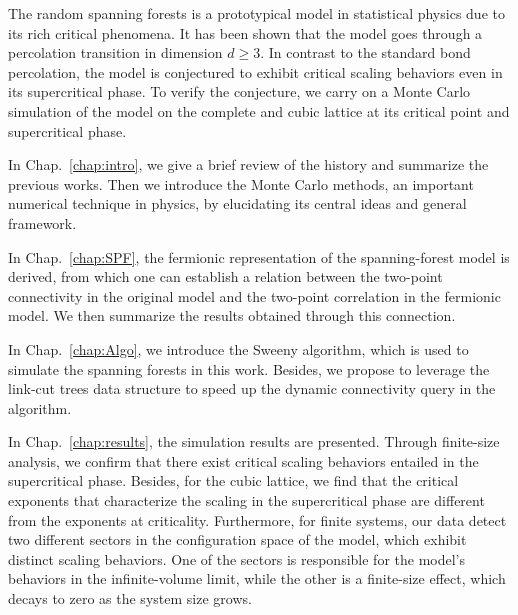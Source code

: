 \begin{abstract*}
The random spanning forests is a prototypical model in statistical physics due to its rich critical phenomena.
It has been shown that the model goes through a percolation transition in dimension $d\geq 3$. In contrast to the standard bond percolation, the model
is conjectured to exhibit critical scaling behaviors even in its supercritical phase. To verify the conjecture, we carry on a Monte
Carlo simulation of the model on the complete and cubic lattice at its critical point and supercritical phase.

In Chap.~\ref{chap:intro}, we give a brief review of the history and summarize the previous works.
Then we introduce the Monte Carlo methods, an important numerical technique in physics, by elucidating its 
central ideas and general framework.

In Chap.~\ref{chap:SPF}, the fermionic representation of the spanning-forest model is derived, from which one can establish a relation between the
two-point connectivity in the original model and the two-point correlation in the fermionic model. We then summarize the results
obtained through this connection.

In Chap.~\ref{chap:Algo}, we introduce the Sweeny algorithm, which is used to simulate the spanning forests in this work. Besides, we propose
to leverage the link-cut trees data structure to speed up the dynamic connectivity query in the algorithm.

In Chap.~\ref{chap:results}, the simulation results are presented. Through finite-size analysis, we confirm that there exist
critical scaling behaviors entailed in the supercritical phase. Besides, for the cubic lattice, we find that the critical exponents
that characterize the scaling in the supercritical phase are different from the exponents at criticality. Furthermore,
for finite systems, our data detect two different sectors in the configuration space of the model, which exhibit distinct
scaling behaviors. One of the sectors is responsible for the model's behaviors in the infinite-volume limit, while the other
is a finite-size effect, which decays to zero as the system size grows.

\end{abstract*}
